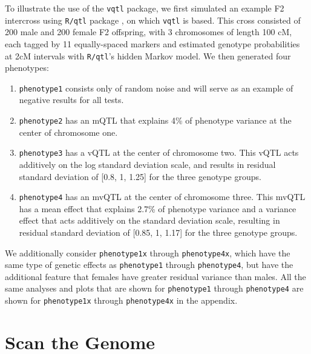 \documentclass[9pt,twocolumn,twoside]{gsag3jnl}
\begin{document}
To illustrate the use of the \texttt{vqtl} package, we first simulated an example F2 intercross using \texttt{R/qtl} package \citep{Broman2003}, on which \texttt{vqtl} is based.
This cross consisted of 200 male and 200 female F2 offspring, with 3 chromosomes of length 100 cM, each tagged by 11 equally-spaced markers and estimated genotype probabilities at 2cM intervals with \texttt{R/qtl}'s hidden Markov model. We then generated four phenotypes:
\begin{enumerate}
	\item \texttt{phenotype1} consists only of random noise and will serve as an example of negative results for all tests.
	\item \texttt{phenotype2} has an mQTL that explains 4\% of phenotype variance at the center of chromosome one.
	\item \texttt{phenotype3} has a vQTL at the center of chromosome two.
        This vQTL acts additively on the log standard deviation scale, and results in residual standard deviation of [0.8, 1, 1.25] for the three genotype groups.
	\item \texttt{phenotype4} has an mvQTL at the center of chromosome three.
        This mvQTL has a mean effect that explains 2.7\% of phenotype variance and a variance effect that acts additively on the standard deviation scale, resulting in residual standard deviation of [0.85, 1, 1.17] for the three genotype groups.
\end{enumerate}

We additionally consider \texttt{phenotype1x} through \texttt{phenotype4x}, which have the same type of genetic effects as \texttt{phenotype1} through \texttt{phenotype4}, but have the additional feature that females have greater residual variance than males.
All the same analyses and plots that are shown for \texttt{phenotype1} through \texttt{phenotype4} are shown for \texttt{phenotype1x} through \texttt{phenotype4x} in the appendix.

\section*{Scan the Genome}
\end{document}
